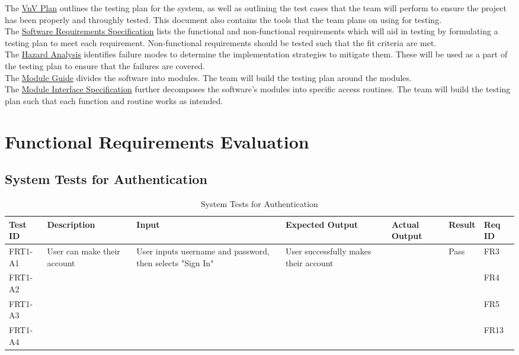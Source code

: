 \documentclass[12pt, titlepage]{article}
\begin{document}
\noindent The \href{https://github.com/stanreee/sign-language-learning/blob/main/docs/VnVPlan/VnVPlan.pdf}{VnV Plan} outlines the testing plan for the system, as well as outlining the test cases that the team will perform to ensure the project has been properly and throughly tested. This document also contains the tools that the team plans on using for testing.\\

\noindent The \href{https://github.com/stanreee/sign-language-learning/blob/main/docs/SRS/SRS.pdf}{Software Requirements Specification} lists the functional and non-functional requirements which will aid in testing by formulating a testing plan to meet each requirement. Non-functional requirements should be tested such that the fit criteria are met.\\

\noindent The \href{https://github.com/stanreee/sign-language-learning/blob/main/docs/HazardAnalysis/HazardAnalysis.pdf}{Hazard Analysis} identifies failure modes to determine the implementation strategies to mitigate them. These will be used as a part of the testing plan to ensure that the failures are covered.\\

\noindent The \href{https://github.com/stanreee/sign-language-learning/blob/main/docs/Design/SoftArchitecture/MG.pdf}{Module Guide} divides the software into modules. The team will build the testing plan around the modules.\\

\noindent The \href{https://github.com/stanreee/sign-language-learning/blob/main/docs/Design/SoftDetailedDes/MIS.pdf}{Module Interface Specification} further decomposes the software's modules into specific access routines. The team will build the testing plan such that each function and routine works as intended.

\section{Functional Requirements Evaluation}

\subsection{System Tests for Authentication}
\begin{longtable}{|p{1cm}|p{3cm}|p{2cm}|p{2cm}|p{2cm}|p{2cm}|p{1cm}|}
\caption{System Tests for Authentication} \\
\hline
\textbf{Test ID} & \textbf{Description} & \textbf{Input} & \textbf{Expected Output} & \textbf{Actual Output} & \textbf{Result} & \textbf{Req ID}\\
\hline
FRT1-A1 & User can make their account & User inputs username and password, then selects "Sign In" & User successfully makes their account & & Pass & FR3\\
\hline
FRT1-A2 & & & & & & FR4 \\
\hline
FRT1-A3 & & & & & & FR5 \\
\hline
FRT1-A4 & & & & & & FR13 \\
\bottomrule
\end{longtable}
\end{document}
